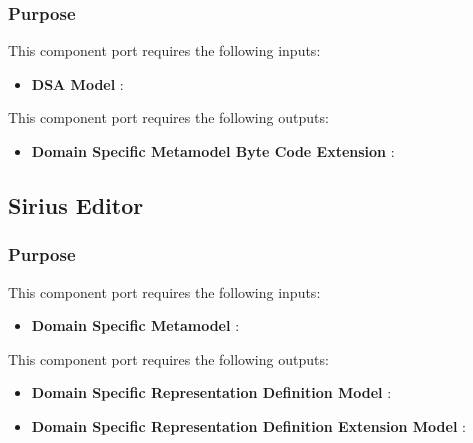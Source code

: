 \documentclass{gemoc} %
\begin{document}

\subsubsection{Purpose}

This component port requires the following inputs:
\begin{itemize}
  \item \textbf{DSA Model} :
\end{itemize}

This component port requires the following outputs:
\begin{itemize}
  \item \textbf{Domain Specific Metamodel Byte Code Extension} :
\end{itemize}

\subsection{Sirius Editor}


\subsubsection{Purpose}

This component port requires the following inputs:
\begin{itemize}
  \item \textbf{Domain Specific Metamodel} :
\end{itemize}

This component port requires the following outputs:
\begin{itemize}
  \item \textbf{Domain Specific  Representation Definition Model} :
  \item \textbf{Domain Specific Representation Definition Extension Model} :
\end{itemize}
\end{document}
